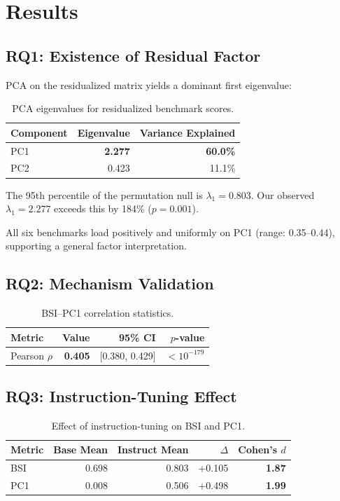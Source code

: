 \section{Results}

\subsection{RQ1: Existence of Residual Factor}

PCA on the residualized matrix yields a dominant first eigenvalue:

\begin{table}[h]
\centering
\caption{PCA eigenvalues for residualized benchmark scores.}
\label{tab:pca}
\begin{tabular}{@{}lrr@{}}
\toprule
Component & Eigenvalue & Variance Explained \\
\midrule
PC1 & \textbf{2.277} & \textbf{60.0\%} \\
PC2 & 0.423 & 11.1\% \\
\bottomrule
\end{tabular}
\end{table}

The 95th percentile of the permutation null is $\lambda_1 = 0.803$. Our observed $\lambda_1 = 2.277$ exceeds this by 184\% ($p = 0.001$).

All six benchmarks load positively and uniformly on PC1 (range: 0.35--0.44), supporting a general factor interpretation.

\subsection{RQ2: Mechanism Validation}

\begin{table}[h]
\centering
\caption{BSI--PC1 correlation statistics.}
\label{tab:bsi}
\begin{tabular}{@{}lrrr@{}}
\toprule
Metric & Value & 95\% CI & $p$-value \\
\midrule
Pearson $\rho$ & \textbf{0.405} & [0.380, 0.429] & $< 10^{-179}$ \\
\bottomrule
\end{tabular}
\end{table}

\subsection{RQ3: Instruction-Tuning Effect}

\begin{table}[h]
\centering
\caption{Effect of instruction-tuning on BSI and PC1.}
\label{tab:instruct}
\begin{tabular}{@{}lrrrr@{}}
\toprule
Metric & Base Mean & Instruct Mean & $\Delta$ & Cohen's $d$ \\
\midrule
BSI & 0.698 & 0.803 & +0.105 & \textbf{1.87} \\
PC1 & 0.008 & 0.506 & +0.498 & \textbf{1.99} \\
\bottomrule
\end{tabular}
\end{table}

